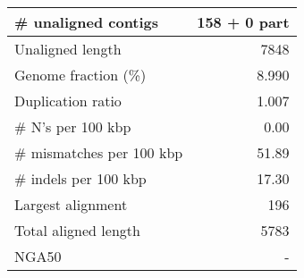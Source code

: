 \documentclass[12pt,a4paper]{article}
\begin{document}
\begin{table}[ht]
\begin{center}
\begin{tabular}{|l*{1}{|r}|}
\# unaligned contigs & 158 + 0 part \\ \hline
Unaligned length & 7848 \\ \hline
Genome fraction (\%) & 8.990 \\ \hline
Duplication ratio & 1.007 \\ \hline
\# N's per 100 kbp & 0.00 \\ \hline
\# mismatches per 100 kbp & 51.89 \\ \hline
\# indels per 100 kbp & 17.30 \\ \hline
Largest alignment & 196 \\ \hline
Total aligned length & 5783 \\ \hline
NGA50 & - \\ \hline
\end{tabular}
\end{center}
\end{table}
\end{document}
